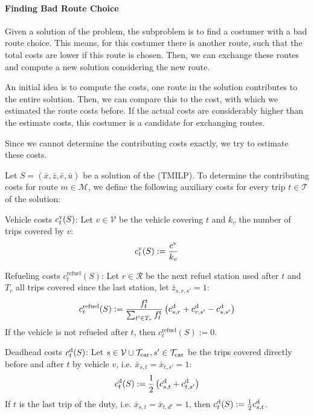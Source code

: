 \paragraph{Finding Bad Route Choice} \parfill

Given a solution of the problem, the subproblem is to find a costumer with a bad route choice. This means, for this costumer there is another route, such that the total costs are lower if this route is chosen. Then, we can exchange these routes and compute a new solution considering the new route. 

An initial idea is to compute the costs, one route in the solution contributes to the entire solution. Then, we can compare this to the cost, with which we estimated the route costs before. If the actual costs are considerably higher than the estimate costs, this costumer is a candidate for exchanging routes.

Since we cannot determine the contributing costs exactly, we try to estimate these costs.

Let $S=\left(\bar{x},\bar{z},\bar{e},\bar{u}\right)$ be a solution of the (TMILP). To determine the contributing costs for route $m\in\mathcal{M}$, we define the following auxiliary costs for every trip $t\in\mathcal{T}$ of the solution:

Vehicle costs $c^{\operatorname{v}}_t(S)$: Let $v\in\mathcal{V}$ be the vehicle covering $t$ and $k_v$ the number of trips covered by $v$:
\begin{align*}
	c^{\operatorname{v}}_t(S) := \frac{c^{\operatorname{v}}}{k_v}
\end{align*}

Refueling costs $c^{\operatorname{refuel}}_t(S)$: Let $r\in\mathcal{R}$ be the next refuel station used after $t$ and $T_r$ all trips covered since the last station, let $\bar{z}_{s,r,s'} = 1$:
\begin{align*}
	c^{\operatorname{refuel}}_t(S) := \frac{f^{\operatorname{t}}_t}{\sum_{t'\in T_r} f^{\operatorname{t}}_t}\left(c^{\operatorname{d}}_{s,r}+c^{\operatorname{d}}_{r,s'}-c^{\operatorname{d}}_{s,s'}\right)
\end{align*}
If the vehicle is not refueled after $t$, then $c^{\operatorname{refuel}}_t(S) := 0$.

Deadhead costs $c^{\operatorname{d}}_t(S)$: Let $s\in\mathcal{V}\cup\mathcal{T}_{\operatorname{car}},s'\in\mathcal{T}_{\operatorname{car}}$ be the trips covered directly before and after $t$ by vehicle $v$, i.e. $\bar{x}_{s,t}=\bar{x}_{t,s'}=1$:
\begin{align*}
	c^{\operatorname{d}}_t(S) := \frac 1 2 \left(c^{\operatorname{d}}_{s,t}+c^{\operatorname{d}}_{t,s'}\right)
\end{align*}
If $t$ is the last trip of the duty, i.e. $\bar{x}_{s,t}=\bar{x}_{t,d^{\operatorname{e}}}=1$, then $c^{\operatorname{d}}_t(S) := \frac 1 2 c^{\operatorname{d}}_{s,t}$.

